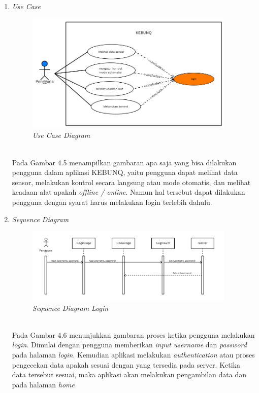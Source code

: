 \begin{flushleft}
\begin{justify}
\begin{enumerate}[label=\alph*.]
            \item \textit{Use Case}
            \begin{figure}[ht]
                \centering
                \includegraphics[width=10cm]{images/bab 4/use-case-user.png}
                \caption{\textit{Use Case Diagram}}
            \end{figure}
            \\Pada Gambar 4.5 menampilkan gambaran apa saja yang bisa dilakukan pengguna dalam aplikasi KEBUNQ, yaitu pengguna dapat melihat data sensor,
            melakukan kontrol secara langsung atau mode otomatis, dan melihat keadaan alat apakah \emph{offline / online}. Namun hal tersebut dapat dilakukan pengguna dengan syarat harus melakukan
            login terlebih dahulu.
            \item \textit{Sequence Diagram}
            \begin{figure}[ht]
                \centering
                \includegraphics[width=10cm]{images/bab 4/Sequence login.png}
                \caption{\textit{Sequence Diagram Login}}
            \end{figure}
            \\Pada Gambar 4.6 menunjukkan gambaran proses ketika pengguna melakukan \emph{login}. Dimulai dengan pengguna memberikan \emph{input} \emph{username} dan \emph{password} pada halaman \emph{login}. Kemudian aplikasi melakukan \emph{authentication} atau proses pengecekan data apakah sesuai dengan yang tersedia pada server. Ketika data tersebut sesuai, maka aplikasi akan melakukan pengambilan data dan pada halaman \emph{home}

\end{enumerate}
\end{justify}
\end{flushleft}
